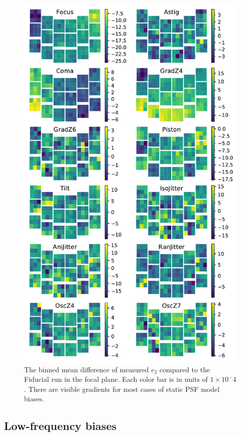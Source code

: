 \documentclass[aps,prd, amsmath,amssymb,superscriptaddress,showkeys,nofootinbib,reprint,preprintnumbers]{revtex4-1}
\begin{document}
\begin{figure}
\begin{center}
\includegraphics[width=\columnwidth]{figures/focal_mean_e2.pdf}
\end{center}
\caption[]{
The binned mean difference of measured $e_2$ compared to the Fiducial run in the focal plane.  Each color bar is in units of $1\times 10^-4$. There are visible gradients for most cases of static PSF model biases.
\label{fig:focal_mean_e2}}
\end{figure}

\subsection{Low-frequency biases}\label{sec:high}
\end{document}
